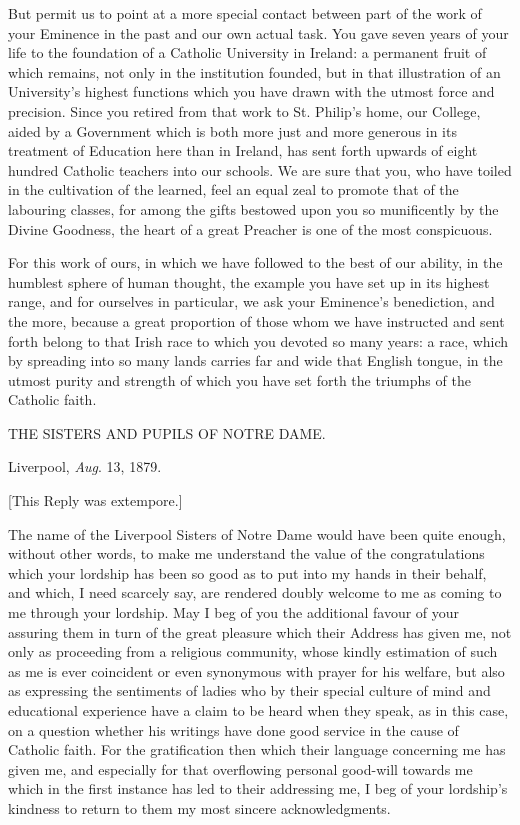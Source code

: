 But permit us to point at a more special contact between part of
the work of your Eminence in the past and our own actual task. You
gave seven years of your life to the foundation of a Catholic
University in Ireland: a permanent fruit of which remains, not only in
the institution founded, but in that illustration of an University's
highest functions which you have drawn with the utmost force and
precision. Since you retired from that work to St. Philip's home, our
College, aided by a Government which is both more just and more
generous in its treatment of Education here than in Ireland, has sent
forth upwards of eight hundred Catholic teachers into our schools. We
are sure that you, who have toiled in the cultivation of the learned,
feel an equal zeal to promote that of the labouring classes, for among
the gifts bestowed upon you so munificently by the Divine Goodness,
the heart of a great Preacher is one of the most conspicuous.

For this work of ours, in which we have followed to the best of our
ability, in the humblest sphere of human thought, the example you have
set up in its highest range, and for ourselves in particular, we ask
your Eminence's benediction, and the more, because a great proportion
of those whom we have instructed and sent forth belong to that Irish
race to which you devoted so many years: a race, which by
spreading into so many lands carries far and wide that English tongue,
in the utmost purity and strength of which you have set forth the
triumphs of the Catholic faith.

THE SISTERS AND
PUPILS OF NOTRE
DAME.

Liverpool, \emph{Aug}. 13, 1879.


[This Reply was extempore.]

The name of the Liverpool Sisters of Notre Dame would have been
quite enough, without other words, to make me understand the value of
the congratulations which your lordship has been so good as to put
into my hands in their behalf, and which, I need scarcely say, are
rendered doubly welcome to me as coming to me through your lordship.
May I beg of you the additional favour of your assuring them in turn
of the great pleasure which their Address has given me, not only as
proceeding from a religious community, whose kindly estimation of such
as me is ever coincident or even synonymous with prayer for his
welfare, but also as expressing the sentiments of ladies who by their
special culture of mind and educational experience have a claim
to be heard when they speak, as in this case, on a question whether
his writings have done good service in the cause of Catholic faith.
For the gratification then which their language concerning me has
given me, and especially for that overflowing personal good-will
towards me which in the first instance has led to their addressing me,
I beg of your lordship's kindness to return to them my most sincere
acknowledgments.


